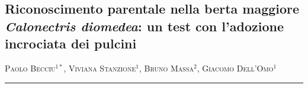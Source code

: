 \setcounter{figure}{0}
\setcounter{table}{0}

\begin{adjustwidth}{-3.5cm}{0cm}
\pagestyle{CIOpage}
\chapter*[Riconoscimento parentale nella berta maggiore]{Riconoscimento parentale nella berta maggiore
\textbf{\textit{Calonectris diomedea}}\textbf{: un test con
l{\textquoteright}adozione incrociata dei pulcini}}

\textsc{Paolo Becciu}$^{1*}$, \textsc{Viviana Stanzione}$^{1}$, 
\textsc{Bruno Massa}$^{2}$, \textsc{Giacomo Dell'Omo}$^{1}$ \\

   
\noindent\color{MUSEBLUE}\rule{27cm}{2pt}
\vspace{1cm}
\end{adjustwidth}



